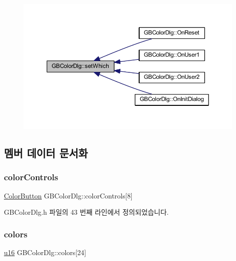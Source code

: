 \begin{figure}[H]
\begin{center}
\leavevmode
\includegraphics[width=350pt]{class_g_b_color_dlg_a1e00eaaeaf344a830f1dd5692e26af1d_icgraph}
\end{center}
\end{figure}


\subsection{멤버 데이터 문서화}
\mbox{\label{class_g_b_color_dlg_a7b80bc0f290c7f26e84283dc7c457240}} 
\subsubsection{\texorpdfstring{color\+Controls}{colorControls}}
{\footnotesize\ttfamily \mbox{\hyperlink{class_color_button}{Color\+Button}} G\+B\+Color\+Dlg\+::color\+Controls\mbox{[}8\mbox{]}}



G\+B\+Color\+Dlg.\+h 파일의 43 번째 라인에서 정의되었습니다.

\mbox{\label{class_g_b_color_dlg_a24de2e906e28d7b4a006d68d6c8afeee}} 
\subsubsection{\texorpdfstring{colors}{colors}}
{\footnotesize\ttfamily \mbox{\hyperlink{_system_8h_a9e6c91d77e24643b888dbd1a1a590054}{u16}} G\+B\+Color\+Dlg\+::colors\mbox{[}24\mbox{]}}



